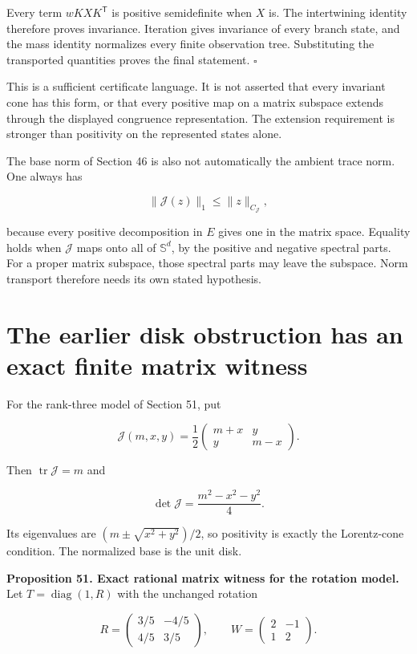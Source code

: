 Every term \(wKXK^{\mathsf T}\) is positive semidefinite when \(X\) is.
The intertwining identity therefore proves invariance. Iteration gives
invariance of every branch state, and the mass identity normalizes every
finite observation tree. Substituting the transported quantities proves
the final statement. \(\square\)

This is a sufficient certificate language. It is not asserted that every
invariant cone has this form, or that every positive map on a matrix
subspace extends through the displayed congruence representation. The
extension requirement is stronger than positivity on the represented
states alone.

The base norm of Section 46 is also not automatically the ambient trace
norm. One always has

\[
\|\mathcal J(z)\|_1\leq\|z\|_{C_{\mathcal J}},
\]

because every positive decomposition in \(E\) gives one in the matrix
space. Equality holds when \(\mathcal J\) maps onto all of
\(\mathbb S^d\), by the positive and negative spectral parts. For a
proper matrix subspace, those spectral parts may leave the subspace.
Norm transport therefore needs its own stated hypothesis.

\section{The earlier disk obstruction has an exact finite matrix witness}\label{LSM:the-earlier-disk-obstruction-has-an-exact-finite-matrix-witness}

For the rank-three model of Section 51, put

\[
\mathcal J(m,x,y)=\frac12
\begin{pmatrix}m+x&y\\y&m-x\end{pmatrix}.
\]

Then \(\operatorname{tr}\mathcal J=m\) and

\[
\det\mathcal J=\frac{m^2-x^2-y^2}{4}.
\]

Its eigenvalues are \((m\pm\sqrt{x^2+y^2})/2\), so positivity is exactly
the Lorentz-cone condition. The normalized base is the unit disk.

\textbf{Proposition 51. Exact rational matrix witness for the rotation
model.} Let \(T=\operatorname{diag}(1,R)\) with the unchanged rotation

\[
R=\begin{pmatrix}3/5&-4/5\\4/5&3/5\end{pmatrix},
\qquad W=\begin{pmatrix}2&-1\\1&2\end{pmatrix}.
\]

